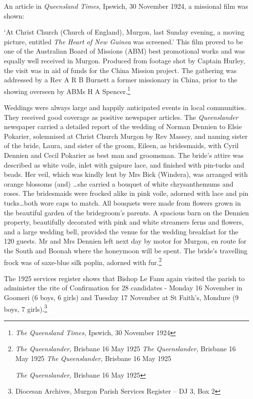 An article in \emph{Queensland Times}, Ipswich, 30 November 1924, a missional film was shown:

`At Christ Church (Church of England), Murgon, last Sunday evening, a moving picture, entitled \emph{The Heart of New Guinea} was screened.' This film proved to be one of the Australian Board of Missions (ABM) best promotional works and was equally well received in Murgon. Produced from footage shot by Captain Hurley, the visit was in aid of funds for the China Mission project\emph{.} The gathering was addressed by a Rev A R B Burnett a former missionary in China, prior to the showing overseen by ABMs H A Spencer.\footnote{\emph{The Queensland Times,} Ipswich, 30 November 1924}

Weddings were always large and happily anticipated events in local communities. They received good coverage as positive newspaper articles. The \emph{Queenslander} newspaper carried a detailed report of the wedding of Norman Dennien to Elsie Pokarier, solemnised at Christ Church Murgon by Rev Massey, and naming sister of the bride, Laura, and sister of the groom, Eileen, as bridesmaids, with Cyril Dennien and Cecil Pokarier as best man and groomsman. The bride's attire was described as white voile, inlet with guipure lace, and finished with pin-tucks and beads. Her veil, which was kindly lent by Mrs Bick (Windera), was arranged with orange blossoms (and) \ldots she carried a bouquet of white chrysanthemums and roses. The bridesmaids were frocked alike in pink voile, adorned with lace and pin tucks\ldots both wore caps to match. All bouquets were made from flowers grown in the beautiful garden of the bridegroom's parents. A spacious barn on the Dennien property, beautifully decorated with pink and white streamers ferns and flowers, and a large wedding bell, provided the venue for the wedding breakfast for the 120 guests. Mr and Mrs Dennien left next day by motor for Murgon, en route for the South and Boonah where the honeymoon will be spent. The bride's travelling frock was of saxe-blue silk poplin, adorned with fur.\footnote{\emph{The Queenslander,} Brisbane 16 May 1925 \emph{The Queenslander,} Brisbane 16 May 1925 \emph{The Queenslander,} Brisbane 16 May 1925

  \emph{The Queenslander,} Brisbane 16 May 1925}

The 1925 services register shows that Bishop Le Fanu again visited the parish to administer the rite of Confirmation for 28 candidates - Monday 16 November in Goomeri (6 boys, 6 girls) and Tuesday 17 November at St Faith's, Mondure (9 boys, 7 girls).\footnote{Diocesan Archives, Murgon Parish Services Register -- DJ 3, Box 2}

